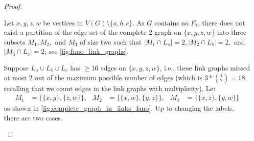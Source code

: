 \begin{proof}
\begin{marginfigure}
\begin{center}
\end{center}
\caption{%
Given an edge $\{a,b,c\}$, we consider any four vertices $x,y,z,w \in L_a\cup L_b\cup L_c$, and on these seven vertices, we construct the Fano plane. Since $G$ contains no $F_7$ subgraph, the edges drawn here must not all appear in the link graphs.\label{fig:fano_link_graphs}}
\end{marginfigure}
\begin{subproof}[Proof of claim.]	

Let $x,y,z,w$ be vertices in $V(G) \setminus \{a,b,c\}$. As $G$ contains no $F_7$, there does not exist a partition of the edge set of the complete 2-graph on $\{x,y,z,w\}$ into three subsets $M_1,M_2,$ and $M_3$ of size two such that  $|M_1\cap L_a|=2, |M_2\cap L_b|=2,$ and $|M_3\cap L_c|=2$; see \cref{fig:fano_link_graphs}. 

Suppose $L_a\cup L_b\cup L_c$ has $\geq 16$ edges on $\{x,y,z,w\}$, i.e., these link graphs missed at most 2 out of the maximum possible number of edges (which is $3*{4\choose 2} = 18$, recalling that we count edges in the link graphs with multiplicity).
Let 
\begin{align*}	
M_1 &=\{ \{x,y\}, \{z,w\} \}, &
M_2 &= \{ \{ x,w \}, \{ y,z \} \}, &
M_3 &=\{ \{x,z\}, \{ y,w \} \}
\end{align*}
as shown in \cref{fig:complete_graph_in_links_fano}. 
Up to changing the labels, there are two cases.
\begin{marginfigure}
\begin{center}
\end{center}
\end{marginfigure}
\end{subproof}
\end{proof}
